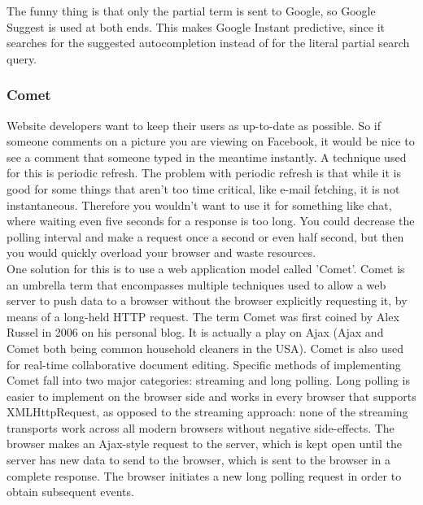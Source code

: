 The funny thing is that only the partial term is sent to Google, so Google Suggest is used at both ends. This makes Google Instant predictive, since it searches for the suggested autocompletion instead of for the literal partial search query.
	
\subsubsection{Comet}
Website developers want to keep their users as up-to-date as possible. So if someone comments on a picture you are viewing on Facebook, it would be nice to see a comment that someone typed in the meantime instantly. A technique used for this is periodic refresh. The problem with periodic refresh is that while it is good for some things that aren't too time critical, like e-mail fetching, it is not instantaneous. Therefore you wouldn't want to use it for something like chat, where waiting even five seconds for a response is too long. You could decrease the polling interval and make a request once a second or even half second, but then you would quickly overload your browser and waste resources.\\
	
One solution for this is to use a web application model called 'Comet'. Comet is an umbrella term that encompasses multiple techniques used to allow a web server to push data to a browser without the browser explicitly requesting it, by means of a long-held HTTP request. The term Comet was first coined by Alex Russel in 2006 on his personal blog. It is actually a play on Ajax (Ajax and Comet both being common household cleaners in the USA). Comet is also used for real-time collaborative document editing. Specific methods of implementing Comet fall into two major categories: streaming and long polling. Long polling is easier to implement on the browser side and works in every browser that supports XMLHttpRequest, as opposed to the streaming approach: none of the streaming transports work across all modern browsers without negative side-effects. The browser makes an Ajax-style request to the server, which is kept open until the server has new data to send to the browser, which is sent to the browser in a complete response. The browser initiates a new long polling request in order to obtain subsequent events.